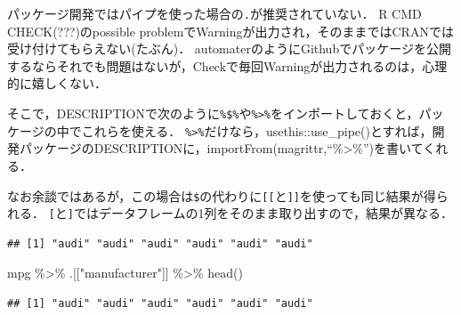 \documentclass[
]{article}
\newenvironment{Shaded}{\begin{snugshade}}{\end{snugshade}}
\newcommand{\FunctionTok}[1]{\textcolor[rgb]{0.00,0.00,0.00}{#1}}
\newcommand{\NormalTok}[1]{#1}
\newcommand{\SpecialCharTok}[1]{\textcolor[rgb]{0.00,0.00,0.00}{#1}}
\newcommand{\StringTok}[1]{\textcolor[rgb]{0.31,0.60,0.02}{#1}}
\begin{document}
パッケージ開発ではパイプを使った場合の\texttt{.}が推奨されていない．
R CMD CHECK(???)のpossible problemでWarningが出力され，そのままではCRANでは受け付けてもらえない(たぶん)．
automaterのようにGithubでパッケージを公開するならそれでも問題はないが，Checkで毎回Warningが出力されるのは，心理的に嬉しくない．

そこで，DESCRIPTIONで次のように\texttt{\%\$\%}や\texttt{\%\textgreater{}\%}をインポートしておくと，パッケージの中でこれらを使える．
\texttt{\%\textgreater{}\%}だけなら，usethis::use\_pipe()とすれば，開発パッケージのDESCRIPTIONに，importFrom(magrittr,``\%\textgreater\%'')を書いてくれる．

\begin{Shaded}
\end{Shaded}

なお余談ではあるが，この場合は\texttt{\$}の代わりに\texttt{{[}{[}}と\texttt{{]}{]}}を使っても同じ結果が得られる．
\texttt{{[}}と\texttt{{]}}ではデータフレームの1列をそのまま取り出すので，結果が異なる．

\begin{Shaded}
\end{Shaded}

\begin{verbatim}
## [1] "audi" "audi" "audi" "audi" "audi" "audi"
\end{verbatim}

\begin{Shaded}
\begin{Highlighting}[]
\NormalTok{mpg }\SpecialCharTok{\%\textgreater{}\%}\NormalTok{ .[[}\StringTok{"manufacturer"}\NormalTok{]] }\SpecialCharTok{\%\textgreater{}\%} \FunctionTok{head}\NormalTok{()}
\end{Highlighting}
\end{Shaded}

\begin{verbatim}
## [1] "audi" "audi" "audi" "audi" "audi" "audi"
\end{verbatim}
\end{document}
